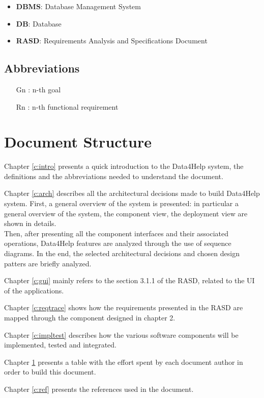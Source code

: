 \begin{itemize}
\item \textbf{DBMS}: Database Management System
\item \textbf{DB}: Database
\item \textbf{RASD}: Requirements Analysis and Specifications Document
\end{itemize}


\subsection{Abbreviations}
\begin{itemize}
\item[Gn]: n-th goal
\item[Rn]: n-th functional requirement
\end{itemize}



\section{Document Structure}
Chapter \ref{c:intro} presents a quick introduction to the Data4Help system, the definitions and the abbreviations needed to understand the document. 

\bigskip\noindent
Chapter \ref{c:arch} describes all the architectural decisions made to build Data4Help system. First, a general overview of the system is presented: in particular a general overview of the system, the component view, the deployment view are shown in details.\\
Then, after presenting all the component interfaces and their associated operations, Data4Help features are analyzed through the use of sequence diagrams.
In the end, the selected architectural decisions and chosen design patters are briefly analyzed.

\bigskip\noindent
Chapter \ref{c:gui} mainly refers to the section 3.1.1 of the RASD, related to the UI of the applications.

\bigskip\noindent
Chapter \ref{c:reqtrace} shows how the requirements presented in the RASD are mapped through the component designed in chapter 2.



\bigskip\noindent
Chapter \ref{c:impltest} describes how the various software components will be implemented, tested and integrated.

\bigskip\noindent
Chapter \ref{} presents a table with the effort spent by each document author in order to build this document.

\bigskip\noindent
Chapter \ref{c:ref} presents the references used in the document.